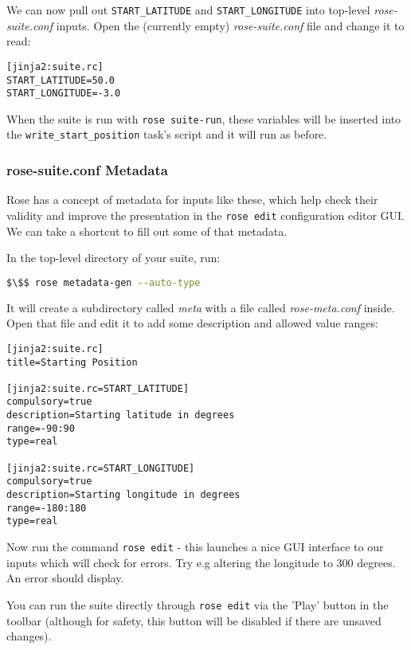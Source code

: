 We can now pull out \lstinline{START_LATITUDE} and \lstinline{START_LONGITUDE} into top-level {\em rose-suite.conf} inputs. Open the (currently empty) {\em rose-suite.conf} file and change it to read:

\lstset{language=suiterc}
\begin{lstlisting}[columns=fullflexible]
[jinja2:suite.rc]
START_LATITUDE=50.0
START_LONGITUDE=-3.0
\end{lstlisting}

When the suite is run with \lstinline{rose suite-run}, these variables will be inserted into the \lstinline{write_start_position} task's script and it will run as before.

\subsubsection{rose-suite.conf Metadata}

Rose has a concept of metadata for inputs like these, which help check their validity and improve the presentation in the \lstinline{rose edit} configuration editor GUI. We can take a shortcut to fill out some of that metadata.

In the top-level directory of your suite, run:

\begin{lstlisting}[mathescape, language=bash]
$\$$ rose metadata-gen --auto-type
\end{lstlisting}

It will create a subdirectory called {\em meta} with a file called {\em rose-meta.conf} inside. Open that file and edit it to add some description and allowed value ranges:

\lstset{language=suiterc}
\begin{lstlisting}[columns=fullflexible]
[jinja2:suite.rc]
title=Starting Position

[jinja2:suite.rc=START_LATITUDE]
compulsory=true
description=Starting latitude in degrees
range=-90:90
type=real

[jinja2:suite.rc=START_LONGITUDE]
compulsory=true
description=Starting longitude in degrees
range=-180:180
type=real
\end{lstlisting}
 
Now run the command \lstinline{rose edit} - this launches a nice GUI interface to our inputs which will check for errors. Try e.g altering the longitude to 300 degrees. An error should display.

You can run the suite directly through \lstinline{rose edit} via the 'Play' button in the toolbar (although for safety, this button will be disabled if there are unsaved changes).

